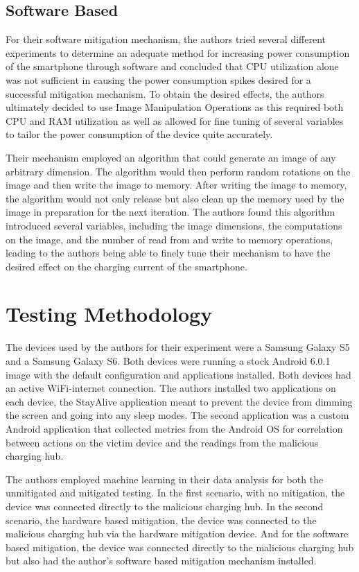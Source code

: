 \subsection{Software Based}
For their software mitigation mechanism, the authors tried several different experiments to determine an adequate method for increasing power consumption of the smartphone through software and concluded that CPU utilization alone was not sufficient in causing the power consumption spikes desired for a successful mitigation mechanism. To obtain the desired effects, the authors ultimately decided to use Image Manipulation Operations as this required both CPU and RAM utilization as well as allowed for fine tuning of several variables to tailor the power consumption of the device quite accurately.

Their mechanism employed an algorithm that could generate an image of any arbitrary dimension. The algorithm would then perform random rotations on the image and then write the image to memory. After writing the image to memory, the algorithm would not only release but also clean up the memory used by the image in preparation for the next iteration. The authors found this algorithm introduced several variables, including the image dimensions, the computations on the image, and the number of read from and write to memory operations, leading to the authors being able to finely tune their mechanism to have the desired effect on the charging current of the smartphone.

\section{Testing Methodology}
The devices used by the authors for their experiment were a Samsung Galaxy S5 and a Samsung Galaxy S6. Both devices were running a stock Android 6.0.1 image with the default configuration and applications installed. Both devices had an active WiFi-internet connection. The authors installed two applications on each device, the StayAlive application meant to prevent the device from dimming the screen and going into any sleep modes. The second application was a custom Android application that collected metrics from the Android OS for correlation between actions on the victim device and the readings from the malicious charging hub.

The authors employed machine learning in their data analysis for both the unmitigated and mitigated testing. In the first scenario, with no mitigation, the device was connected directly to the malicious charging hub. In the second scenario, the hardware based mitigation, the device was connected to the malicious charging hub via the hardware mitigation device. And for the software based mitigation, the device was connected directly to the malicious charging hub but also had the author's software based mitigation mechanism installed.

